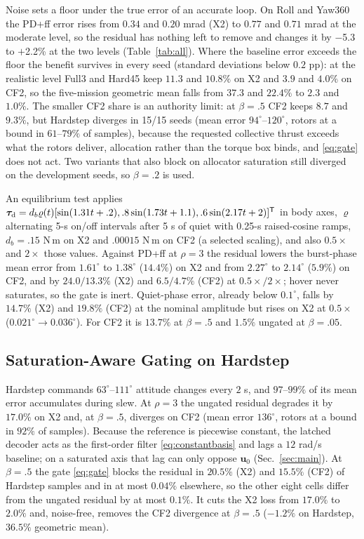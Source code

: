 \documentclass[letterpaper, 10 pt, conference]{ieeeconf}
\newcommand{\T}{^{\mathsf T}}
\begin{document}
Noise sets a floor under the true error of an accurate loop. On Roll and Yaw360 the PD+ff error rises from $0.34$ and $0.20$ mrad (X2) to $0.77$ and $0.71$ mrad at the moderate level, so the residual has nothing left to remove and changes it by $-$5.3 to $+$2.2\% at the two levels (Table~\ref{tab:all}). Where the baseline error exceeds the floor the benefit survives in every seed (standard deviations below $0.2$ pp): at the realistic level Full3 and Hard45 keep $11.3$ and $10.8\%$ on X2 and $3.9$ and $4.0\%$ on CF2, so the five-mission geometric mean falls from $37.3$ and $22.4\%$ to $2.3$ and $1.0\%$. The smaller CF2 share is an authority limit: at $\beta=.5$ CF2 keeps $8.7$ and $9.3\%$, but Hardstep diverges in 15/15 seeds (mean error $94^\circ$--$120^\circ$, rotors at a bound in $61$--$79\%$ of samples), because the requested collective thrust exceeds what the rotors deliver, allocation rather than the torque box binds, and \eqref{eq:gate} does not act. Two variants that also block on allocator saturation still diverged on the development seeds, so $\beta=.2$ is used.

\label{sec:disturbance}
An equilibrium test applies $\bm\tau_{\rm d}=d_b\varrho(t)[\sin(1.31t+.2),\allowbreak .8\sin(1.73t+1.1),\allowbreak.6\sin(2.17t+2)]\T$ in body axes, $\varrho$ alternating 5-s on/off intervals after 5 s of quiet with 0.25-s raised-cosine ramps, $d_b=.15$ N\,m on X2 and $.00015$ N\,m on CF2 (a selected scaling), and also $0.5\times$ and $2\times$ those values. Against PD+ff at $\rho=3$ the residual lowers the burst-phase mean error from $1.61^\circ$ to $1.38^\circ$ ($14.4\%$) on X2 and from $2.27^\circ$ to $2.14^\circ$ ($5.9\%$) on CF2, and by $24.0/13.3\%$ (X2) and $6.5/4.7\%$ (CF2) at $0.5\times/2\times$; hover never saturates, so the gate is inert. Quiet-phase error, already below $0.1^\circ$, falls by $14.7\%$ (X2) and $19.8\%$ (CF2) at the nominal amplitude but rises on X2 at $0.5\times$ ($0.021^\circ\to0.036^\circ$). For CF2 it is $13.7\%$ at $\beta=.5$ and $1.5\%$ ungated at $\beta=.05$.

\subsection{Saturation-Aware Gating on Hardstep}
\label{sec:failure}
Hardstep commands $63^\circ$--$111^\circ$ attitude changes every $2$ s, and $97$--$99\%$ of its mean error accumulates during slew. At $\rho=3$ the ungated residual degrades it by $17.0\%$ on X2 and, at $\beta=.5$, diverges on CF2 (mean error $136^\circ$, rotors at a bound in $92\%$ of samples). Because the reference is piecewise constant, the latched decoder acts as the first-order filter \eqref{eq:constantbasis} and lags a $12$ rad/s baseline; on a saturated axis that lag can only oppose $\bm u_0$ (Sec.~\ref{sec:main}). At $\beta=.5$ the gate \eqref{eq:gate} blocks the residual in $20.5\%$ (X2) and $15.5\%$ (CF2) of Hardstep samples and in at most $0.04\%$ elsewhere, so the other eight cells differ from the ungated residual by at most $0.1\%$. It cuts the X2 loss from $17.0\%$ to $2.0\%$ and, noise-free, removes the CF2 divergence at $\beta=.5$ ($-1.2\%$ on Hardstep, $36.5\%$ geometric mean).
\end{document}
